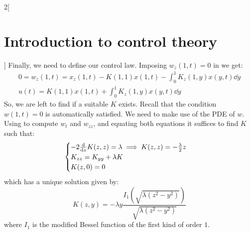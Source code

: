 \documentclass[../../../main_math.tex]{subfiles}
\begin{document}
\begin{multicols}{2}[\section{Introduction to control theory}]
  Finally, we need to define our control law. Imposing $w_z(1,t)=0$ in  we get:
  \begin{gather*}
    0\!=\!w_z(1,t)\!=\!x_z(1,t)\!-\!K(1,1)x(1,t)\!-\!\int_0^1\! K_z(1,y)x(y,t)\dd y\\
    u(t)=K(1,1)x(1,t)+\int_0^1 K_z(1,y)x(y,t)\dd y
  \end{gather*}
  So, we are left to find if a suitable $K$ exists. Recall that the condition $w(1,t)=0$ is automatically satisfied. We need to make use of the PDE of $w$. Using  to compute $w_t$ and $w_{zz}$, and equating both equations it suffices to find $K$ such that:
  $$
    \begin{cases}
      -2\dv{}{z}K(z,z)=\lambda\implies K(z,z)=-\frac{\lambda}{2}z \\
      K_{zz}=K_{yy}+\lambda K                                     \\
      K(z,0)=0
    \end{cases}
  $$
  which has a unique solution given by:
  $$
    K(z,y)=-\lambda y\frac{I_1(\sqrt{\lambda(z^2-y^2)})}{\sqrt{\lambda(z^2-y^2)}}
  $$
  where $I_1$ is the modified Bessel function of the first kind of order $1$.
\end{multicols}
\end{document}
